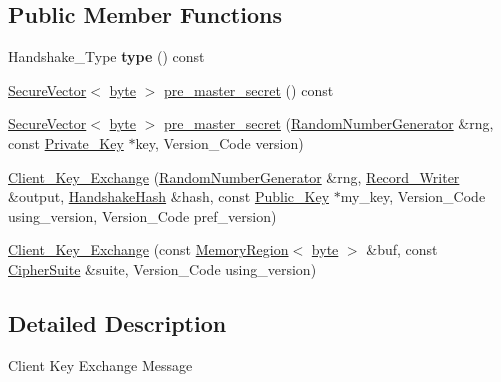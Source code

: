 \subsection*{Public Member Functions}
\begin{DoxyCompactItemize}
\item 
\hypertarget{classBotan_1_1Client__Key__Exchange_aed66315cdbdea1e22a66af093d907ef6}{Handshake\-\_\-\-Type {\bfseries type} () const }\label{classBotan_1_1Client__Key__Exchange_aed66315cdbdea1e22a66af093d907ef6}

\item 
\hyperlink{classBotan_1_1SecureVector}{Secure\-Vector}$<$ \hyperlink{namespaceBotan_a7d793989d801281df48c6b19616b8b84}{byte} $>$ \hyperlink{classBotan_1_1Client__Key__Exchange_a4908058595616c0d59d1cbe19e3440a5}{pre\-\_\-master\-\_\-secret} () const 
\item 
\hyperlink{classBotan_1_1SecureVector}{Secure\-Vector}$<$ \hyperlink{namespaceBotan_a7d793989d801281df48c6b19616b8b84}{byte} $>$ \hyperlink{classBotan_1_1Client__Key__Exchange_abc78474b7f0fbd9182beed8fa66ec864}{pre\-\_\-master\-\_\-secret} (\hyperlink{classBotan_1_1RandomNumberGenerator}{Random\-Number\-Generator} \&rng, const \hyperlink{classBotan_1_1Private__Key}{Private\-\_\-\-Key} $\ast$key, Version\-\_\-\-Code version)
\item 
\hyperlink{classBotan_1_1Client__Key__Exchange_ab67fe55d2ca9be7b207a2bedd295c97c}{Client\-\_\-\-Key\-\_\-\-Exchange} (\hyperlink{classBotan_1_1RandomNumberGenerator}{Random\-Number\-Generator} \&rng, \hyperlink{classBotan_1_1Record__Writer}{Record\-\_\-\-Writer} \&output, \hyperlink{classBotan_1_1HandshakeHash}{Handshake\-Hash} \&hash, const \hyperlink{classBotan_1_1Public__Key}{Public\-\_\-\-Key} $\ast$my\-\_\-key, Version\-\_\-\-Code using\-\_\-version, Version\-\_\-\-Code pref\-\_\-version)
\item 
\hyperlink{classBotan_1_1Client__Key__Exchange_aeaf2ab2decfb1fb7e138aeb5ec249166}{Client\-\_\-\-Key\-\_\-\-Exchange} (const \hyperlink{classBotan_1_1MemoryRegion}{Memory\-Region}$<$ \hyperlink{namespaceBotan_a7d793989d801281df48c6b19616b8b84}{byte} $>$ \&buf, const \hyperlink{classBotan_1_1CipherSuite}{Cipher\-Suite} \&suite, Version\-\_\-\-Code using\-\_\-version)
\end{DoxyCompactItemize}


\subsection{Detailed Description}
Client Key Exchange Message 

